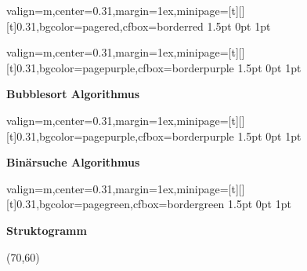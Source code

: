 \documentclass[11pt, a4paper, landscape]{article}
\newcommand{\fancyheader}[1]{
	\centerline{\sffamily \textbf{ \large #1}}
}
\newenvironment{fancybox}[2]
{
	\begin{adjustbox}{valign=m,center=0.31\textwidth,margin=1ex,minipage=[t][][t]{0.31\textwidth},bgcolor=#1,cfbox=#2 1.5pt 0pt 1pt}
	\begin{centering}
}
{
	\end{centering}
	\end{adjustbox}
}
\begin{document}
\begin{multicols}{3}
\begin{fancybox}{pagered}{borderred}
\end{fancybox}

\begin{fancybox}{pagepurple}{borderpurple}
\fancyheader{Bubblesort Algorithmus}

\end{fancybox}

\begin{fancybox}{pagepurple}{borderpurple}
\fancyheader{Binärsuche Algorithmus}

\end{fancybox}

\begin{fancybox}{pagegreen}{bordergreen}
\fancyheader{Struktogramm}

\begin{struktogramm}(70,60)
			\change
		\ifend
		\change
	\ifend
\end{struktogramm}

\end{fancybox}


\end{multicols}
\end{document}
